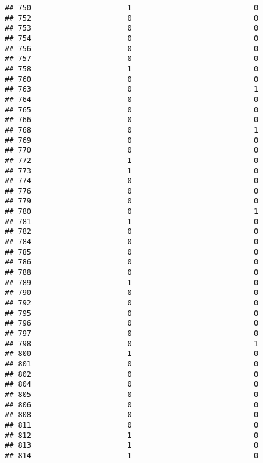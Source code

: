 \documentclass[
]{article}
\begin{document}
\begin{verbatim}
## 750                      1                            0
## 752                      0                            0
## 753                      0                            0
## 754                      0                            0
## 756                      0                            0
## 757                      0                            0
## 758                      1                            0
## 760                      0                            0
## 763                      0                            1
## 764                      0                            0
## 765                      0                            0
## 766                      0                            0
## 768                      0                            1
## 769                      0                            0
## 770                      0                            0
## 772                      1                            0
## 773                      1                            0
## 774                      0                            0
## 776                      0                            0
## 779                      0                            0
## 780                      0                            1
## 781                      1                            0
## 782                      0                            0
## 784                      0                            0
## 785                      0                            0
## 786                      0                            0
## 788                      0                            0
## 789                      1                            0
## 790                      0                            0
## 792                      0                            0
## 795                      0                            0
## 796                      0                            0
## 797                      0                            0
## 798                      0                            1
## 800                      1                            0
## 801                      0                            0
## 802                      0                            0
## 804                      0                            0
## 805                      0                            0
## 806                      0                            0
## 808                      0                            0
## 811                      0                            0
## 812                      1                            0
## 813                      1                            0
## 814                      1                            0

\end{verbatim}
\end{document}

